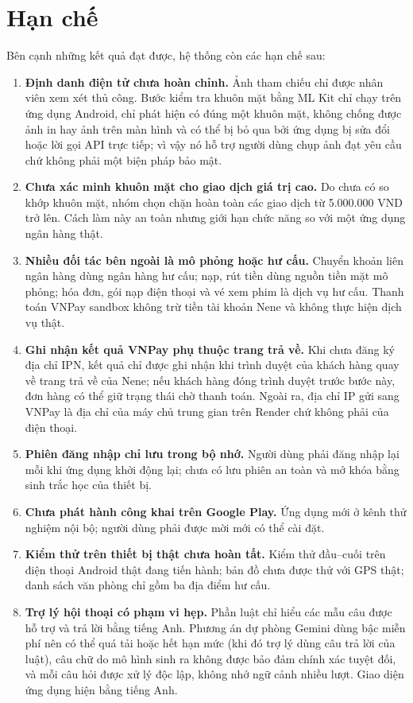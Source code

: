 \section{Hạn chế}
\label{sec:ch5-han-che}

Bên cạnh những kết quả đạt được, hệ thống còn các hạn chế sau:
\begin{enumerate}
	\item \textbf{Định danh điện tử chưa hoàn chỉnh.} Ảnh tham chiếu chỉ được nhân viên xem xét thủ công. Bước kiểm tra khuôn mặt bằng ML Kit chỉ chạy trên ứng dụng Android, chỉ phát hiện có đúng một khuôn mặt, không chống được ảnh in hay ảnh trên màn hình và có thể bị bỏ qua bởi ứng dụng bị sửa đổi hoặc lời gọi API trực tiếp; vì vậy nó hỗ trợ người dùng chụp ảnh đạt yêu cầu chứ không phải một biện pháp bảo mật.
	\item \textbf{Chưa xác minh khuôn mặt cho giao dịch giá trị cao.} Do chưa có so khớp khuôn mặt, nhóm chọn chặn hoàn toàn các giao dịch từ 5.000.000 VND trở lên. Cách làm này an toàn nhưng giới hạn chức năng so với một ứng dụng ngân hàng thật.
	\item \textbf{Nhiều đối tác bên ngoài là mô phỏng hoặc hư cấu.} Chuyển khoản liên ngân hàng dùng ngân hàng hư cấu; nạp, rút tiền dùng nguồn tiền mặt mô phỏng; hóa đơn, gói nạp điện thoại và vé xem phim là dịch vụ hư cấu. Thanh toán VNPay sandbox không trừ tiền tài khoản Nene và không thực hiện dịch vụ thật.
	\item \textbf{Ghi nhận kết quả VNPay phụ thuộc trang trả về.} Khi chưa đăng ký địa chỉ IPN, kết quả chỉ được ghi nhận khi trình duyệt của khách hàng quay về trang trả về của Nene; nếu khách hàng đóng trình duyệt trước bước này, đơn hàng có thể giữ trạng thái chờ thanh toán. Ngoài ra, địa chỉ IP gửi sang VNPay là địa chỉ của máy chủ trung gian trên Render chứ không phải của điện thoại.
	\item \textbf{Phiên đăng nhập chỉ lưu trong bộ nhớ.} Người dùng phải đăng nhập lại mỗi khi ứng dụng khởi động lại; chưa có lưu phiên an toàn và mở khóa bằng sinh trắc học của thiết bị.
	\item \textbf{Chưa phát hành công khai trên Google Play.} Ứng dụng mới ở kênh thử nghiệm nội bộ; người dùng phải được mời mới có thể cài đặt.
	\item \textbf{Kiểm thử trên thiết bị thật chưa hoàn tất.} Kiểm thử đầu--cuối trên điện thoại Android thật đang tiến hành; bản đồ chưa được thử với GPS thật; danh sách văn phòng chỉ gồm ba địa điểm hư cấu.
	\item \textbf{Trợ lý hội thoại có phạm vi hẹp.} Phần luật chỉ hiểu các mẫu câu được hỗ trợ và trả lời bằng tiếng Anh. Phương án dự phòng Gemini dùng bậc miễn phí nên có thể quá tải hoặc hết hạn mức (khi đó trợ lý dùng câu trả lời của luật), câu chữ do mô hình sinh ra không được bảo đảm chính xác tuyệt đối, và mỗi câu hỏi được xử lý độc lập, không nhớ ngữ cảnh nhiều lượt. Giao diện ứng dụng hiện bằng tiếng Anh.

\end{enumerate}
